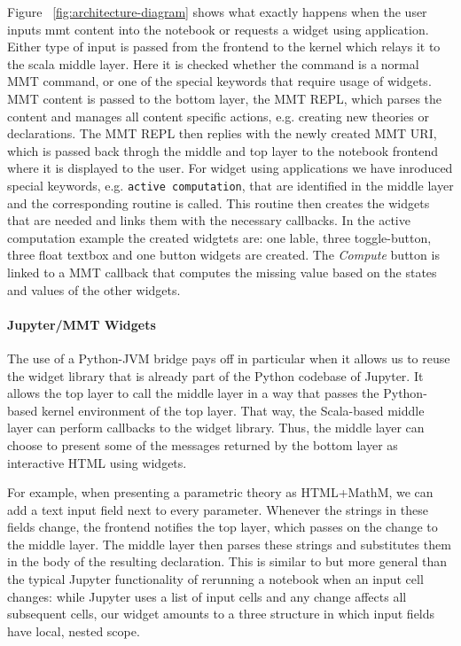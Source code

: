 Figure ~\ref{fig:architecture-diagram} shows what exactly happens when the user inputs mmt content into the notebook or requests a widget using application.  
Either type of input is passed from the frontend to the kernel which relays it to the scala middle layer. Here it is checked whether the command is a normal MMT command, or one of the special keywords that require usage of widgets. MMT content is passed to the bottom layer, the MMT REPL, which parses the content and manages all content specific actions, e.g. creating new theories or declarations. The MMT REPL then replies with the newly created MMT URI, which is passed back throgh the middle and top layer to the notebook frontend where it is displayed to the user.
For widget using applications we have inroduced special keywords, e.g. \texttt{active computation}, that are identified in the middle layer and the corresponding routine is called. This routine then creates the widgets that are needed and links them with the necessary callbacks. In the active computation example the created widgtets are: one lable, three toggle-button, three float textbox and one button widgets are created. The \textit{Compute} button is linked to a MMT callback that computes the missing value based on the states and values of the other widgets.


\paragraph{Jupyter/MMT Widgets}
The use of a Python-JVM bridge pays off in particular when it allows us to reuse the widget library that is already part of the Python codebase of Jupyter.
It allows the top layer to call the middle layer in a way that passes the Python-based kernel environment of the top layer.
That way, the Scala-based middle layer can perform callbacks to the widget library.
Thus, the middle layer can choose to present some of the messages returned by the bottom layer as interactive HTML using widgets.

For example, when presenting a parametric theory as HTML+MathM, we can add a text input field next to every parameter.
Whenever the strings in these fields change, the frontend notifies the top layer, which passes on the change to the middle layer.
The middle layer then parses these strings and substitutes them in the body of the resulting declaration.
This is similar to but more general than the typical Jupyter functionality of rerunning a notebook when an input cell changes: while Jupyter uses a list of input cells and any change affects all subsequent cells, our widget amounts to a three structure in which input fields have local, nested scope.

